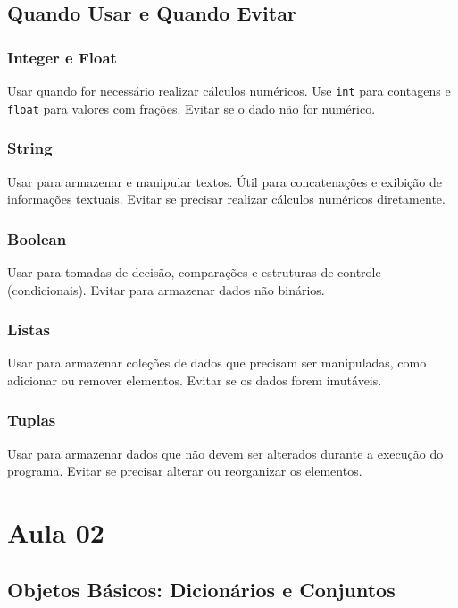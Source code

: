 \documentclass{sciposter}
\begin{document}
\begin{multicols}{3}
\subsection{Quando Usar e Quando Evitar}

\subsubsection{Integer e Float}
Usar quando for necessário realizar cálculos numéricos. Use \texttt{int} para contagens e \texttt{float} para valores com frações. Evitar se o dado não for numérico.

\subsubsection{String}
Usar para armazenar e manipular textos. Útil para concatenações e exibição de informações textuais. Evitar se precisar realizar cálculos numéricos diretamente.

\subsubsection{Boolean}
Usar para tomadas de decisão, comparações e estruturas de controle (condicionais). Evitar para armazenar dados não binários.

\subsubsection{Listas}
Usar para armazenar coleções de dados que precisam ser manipuladas, como adicionar ou remover elementos. Evitar se os dados forem imutáveis.

\subsubsection{Tuplas}
Usar para armazenar dados que não devem ser alterados durante a execução do programa. Evitar se precisar alterar ou reorganizar os elementos.

\section{Aula 02}

\subsection{Objetos Básicos: Dicionários e Conjuntos}


\end{multicols}
\end{document}
